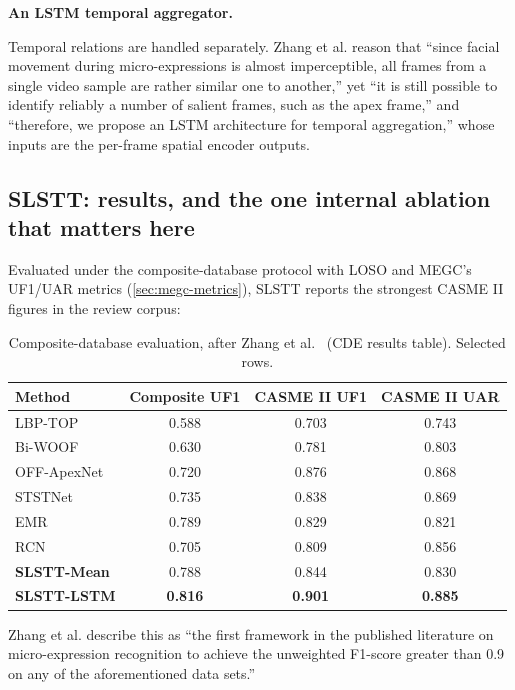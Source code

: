\textbf{An LSTM temporal aggregator.}

Temporal relations are handled separately. Zhang et al. reason that ``since facial movement during micro-expressions is almost imperceptible, all frames from a single video sample are rather similar one to another,'' yet ``it is still possible to identify reliably a number of salient frames, such as the apex frame,'' and ``therefore, we propose an LSTM architecture for temporal aggregation,'' whose inputs are the per-frame spatial encoder outputs.

\subsection{SLSTT: results, and the one internal ablation that matters here}
\label{sec:slstt-results}

Evaluated under the composite-database protocol with LOSO and MEGC's UF1/UAR metrics (\autoref{sec:megc-metrics}), SLSTT reports the strongest CASME II figures in the review corpus:

\begin{table}[htbp]
	\centering
	\begin{tabular}{l c c c}
		\hline
		\textbf{Method} & \textbf{Composite UF1} & \textbf{CASME II UF1} & \textbf{CASME II UAR} \\
		\hline
		LBP-TOP                        & 0.588 & 0.703 & 0.743 \\
		Bi-WOOF                        & 0.630 & 0.781 & 0.803 \\
		OFF-ApexNet~\cite{liong2019a}  & 0.720 & 0.876 & 0.868 \\
		STSTNet~\cite{liong2019b}      & 0.735 & 0.838 & 0.869 \\
		EMR~\cite{liu2019}             & 0.789 & 0.829 & 0.821 \\
		RCN~\cite{xia2020b}            & 0.705 & 0.809 & 0.856 \\
		\textbf{SLSTT-Mean}            & 0.788 & 0.844 & 0.830 \\
		\textbf{SLSTT-LSTM}            & \textbf{0.816} & \textbf{0.901} & \textbf{0.885} \\
		\hline
	\end{tabular}
	\caption[Composite-database evaluation reported for SLSTT]{Composite-database evaluation, after Zhang et al.~\cite{zhang2022} (CDE results table). Selected rows.}
	\label{tab:slstt-results}
\end{table}

Zhang et al. describe this as ``the first framework in the published literature on micro-expression recognition to achieve the unweighted F1-score greater than 0.9 on any of the aforementioned data sets.''

